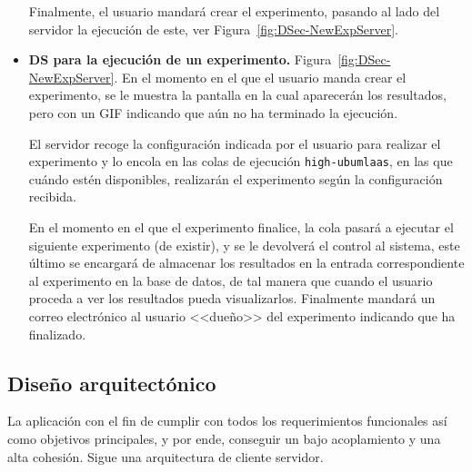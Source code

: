 \begin{itemize}
Finalmente, el usuario mandará crear el experimento, pasando al lado del servidor la ejecución de este, ver Figura~\ref{fig:DSec-NewExpServer}.

\item \textbf{DS para la ejecución de un experimento.} Figura~\ref{fig:DSec-NewExpServer}. En el momento en el que el usuario manda crear el experimento, se le muestra la pantalla en la cual aparecerán los resultados, pero con un GIF indicando que aún no ha terminado la ejecución. 

El servidor recoge la configuración indicada por el usuario para realizar el experimento y lo encola en las colas de ejecución \texttt{high-ubumlaas}, en las que cuándo estén disponibles, realizarán el experimento según la configuración recibida. 

En el momento en el que el experimento finalice, la cola pasará a ejecutar el siguiente experimento (de existir), y se le devolverá el control al sistema, este último se encargará de almacenar los resultados en la entrada correspondiente al experimento en la base de datos, de tal manera que cuando el usuario proceda a ver los resultados pueda visualizarlos. Finalmente mandará un correo electrónico al usuario <<dueño>> del experimento indicando que ha finalizado.

\end{itemize}

\clearpage
{}
\begin{landscape}
\end{landscape}

\subsection{Diseño arquitectónico}
La aplicación con el fin de cumplir con todos los requerimientos funcionales así como objetivos principales, y por ende, conseguir un bajo acoplamiento y una alta cohesión. Sigue una arquitectura de cliente servidor.

